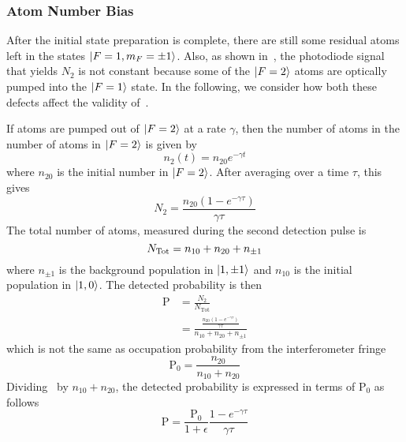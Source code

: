 \subsubsection{Atom Number Bias}\label{subsec:atom_number_bias}
After the initial state preparation is complete, there are still some
residual atoms left in the states $\ket{F=1, m_F = \pm 1}$. Also, as
shown in~, the photodiode signal that
yields $N_2$ is not constant because some of the $\ket{F=2}$ atoms are
optically pumped into the $\ket{F=1}$ state. In the following, we
consider how both these defects affect the validity
of~.
\par\noindent
If atoms are pumped out of
\(\ket{F=2}\) at a rate \(\gamma\), then the number of atoms in the
number of atoms in $\ket{F=2}$ is given by
\begin{equation}
  n_2(t) = n_{20}e^{-\gamma t}
  \label{eq:n2_time}
\end{equation}
where \(n_{20}\) is the initial number in \(\ket{F=2}\). After
averaging over a time \(\tau\), this gives
\begin{equation}
  N_2 = \frac{n_{20} (1-e^{-\gamma \tau})}{\gamma \tau}
  \label{eq:n2_avg}
\end{equation}
The total number of atoms, measured during the second detection pulse
is
\begin{equation}
  N_\textnormal{Tot} =  n_{10} + n_{20} + n_{\pm 1}
  \label{eq:n1_avg}
\end{equation}
where \(n_{\pm 1}\) is the background population in
\(\ket{1,\pm{1}}\) and $n_{10}$ is the initial population in
$\ket{1,0}$. The detected probability is then
\begin{align}
  \text{P} &= \frac{N_2}{N_\text{Tot}} \nonumber \\
    &= \frac{\frac{n_{20} (1-e^{-\gamma \tau})}{\gamma \tau}}{n_{10} +
    n_{20} + n_{\pm 1}}
    \label{eq:prob_bias}
\end{align}
which is not the same as occupation probability from the
interferometer fringe
\begin{equation}
  \text{P}_0 = \frac{n_{20}}{n_{10} + n_{20}}
\end{equation}
Dividing~ by $n_{10}+n_{20}$, the detected
probability is expressed in terms of $\text{P}_0$ as
follows 
\begin{equation}
  \text{P} = \frac{\text{P}_0}{1+\epsilon}\frac{1-e^{-\gamma \tau}}{\gamma \tau}
\end{equation}

